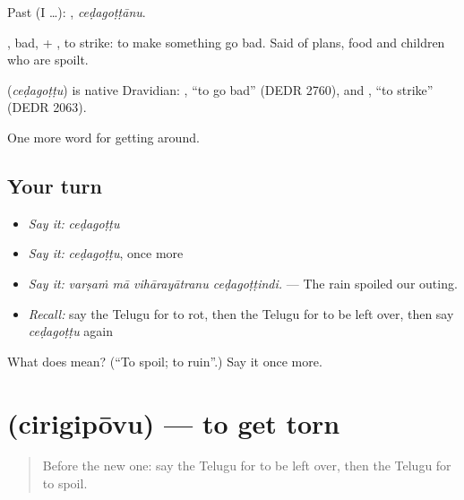 Past (I …): , \emph{ceḍagoṭṭānu}.

, bad, + , to strike: to make something go bad. Said of plans, food and children who are spoilt.

\begin{cousinweb}
\textbf{} (\emph{ceḍagoṭṭu}) is native Dravidian: , \textquotedblleft{}to go bad\textquotedblright{} (DEDR 2760), and , \textquotedblleft{}to strike\textquotedblright{} (DEDR 2063).
\end{cousinweb}

\begin{grammarlens}[title={What you've built}]
One more word for getting around.
\end{grammarlens}

\subsection*{Your turn}
\begin{itemize}
\raggedright
  \item \emph{Say it:} \emph{ceḍagoṭṭu}
  \item \emph{Say it:} \emph{ceḍagoṭṭu}, once more
  \item \emph{Say it:} \emph{varṣaṁ mā vihārayātranu ceḍagoṭṭindi.} — The rain spoiled our outing.
  \item \emph{Recall:} say the Telugu for to rot, then the Telugu for to be left over, then say \emph{ceḍagoṭṭu} again
\end{itemize}

\begin{tcolorbox}[breakable,colback=teal!4,colframe=teal!35!black,title={Before you move on}]
What does  mean? (\textquotedblleft{}To spoil; to ruin\textquotedblright{}.) Say it once more.
\end{tcolorbox}
\section[\texorpdfstring{\te{చిరిగిపోవు} (cirigipōvu)}{చిరిగిపోవు (cirigipōvu)}]{ (cirigipōvu) — to get torn}

\label{lesson:TE-C490-cirigipovu}



\begin{quote}
Before the new one: say the Telugu for to be left over, then the Telugu for to spoil.
\end{quote}

